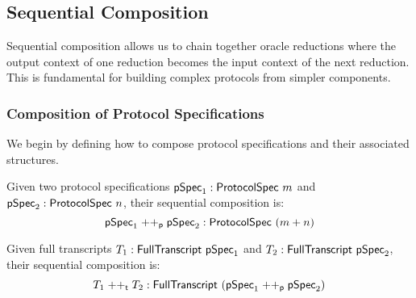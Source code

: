 



\subsection{Sequential Composition}\label{sec:sequential_composition}

Sequential composition allows us to chain together oracle reductions where the output context of one reduction becomes the input context of the next reduction. This is fundamental for building complex protocols from simpler components.

\subsubsection{Composition of Protocol Specifications}

We begin by defining how to compose protocol specifications and their associated structures.

\begin{definition}
    \label{def:protocol_spec_append}
    Given two protocol specifications $\pSpec_1 : \ProtocolSpec\ m$ and $\pSpec_2 : \ProtocolSpec\ n$, their sequential composition is:
    \[ \mathsf{pSpec}_1 \mathrel{++_\mathsf{p}} \mathsf{pSpec}_2 : \mathsf{ProtocolSpec}\ (m + n) \]
\end{definition}

\begin{definition}
    \label{def:full_transcript_append}
    Given full transcripts $T_1 : \mathsf{FullTranscript}\ \mathsf{pSpec}_1$ and $T_2 : \mathsf{FullTranscript}\ \mathsf{pSpec}_2$, their sequential composition is:
    \[ T_1 \mathrel{++_\mathsf{t}} T_2 : \mathsf{FullTranscript}\ (\mathsf{pSpec}_1 \mathrel{++_\mathsf{p}} \mathsf{pSpec}_2) \]
\end{definition}

